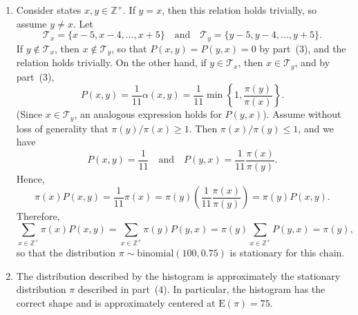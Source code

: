 \documentclass[12pt]{article}
\newcommand{\E}{\mathrm{E}}
\begin{document}
\begin{enumerate}
\item
Consider states $x, y \in \mathbb{Z}^+$. If $y = x$, then this relation holds trivially, so assume $y \neq x$. Let
\begin{equation*}
\mathcal{T}_x = \{x-5, x-4, \ldots, x+5\} \quad \text{and} \quad \mathcal{T}_y = \{y-5, y-4, \ldots, y+5\}.
\end{equation*}
If $y \not \in \mathcal{T}_x$, then $x \not \in \mathcal{T}_y$, so that $P(x, y) = P(y, x) = 0$ by part~(3), and the relation holds trivially. On the other hand, if $y \in \mathcal{T}_x$, then $x \in \mathcal{T}_y$, and by part~(3),
\begin{equation*}
P(x, y) = \frac{1}{11} \alpha(x, y) = \frac{1}{11} \min\left\{1, \frac{\pi(y)}{\pi(x)} \right\}.
\end{equation*}
(Since $x \in \mathcal{T}_y$, an analogous expression holds for $P(y, x)$). Assume without loss of generality that $\pi(y) / \pi(x) \geq 1$. Then $\pi(x) / \pi(y) \leq 1$, and we have
\begin{equation*}
P(x, y) = \frac{1}{11} \quad \text{and} \quad P(y, x) = \frac{1}{11} \frac{\pi(x)}{\pi(y)}.
\end{equation*}
Hence,
\begin{equation*}
\pi(x) P(x, y) = \frac{1}{11} \pi(x) = \pi(y) \left(\frac{1}{11} \frac{\pi(x)}{\pi(y)}\right) = \pi(y) P(x, y).
\end{equation*}
Therefore,
\begin{equation*}
\sum_{x \in \mathbb{Z}^+} \pi(x) P(x, y) = \sum_{x \in \mathbb{Z}^+} \pi(y) P(y, x) = \pi(y) \sum_{x \in \mathbb{Z}^+} P(y, x) = \pi(y),
\end{equation*}
so that the distribution $\pi \sim \mathrm{binomial(100, 0.75)}$ is stationary for this chain.

\item
The distribution described by the histogram is approximately the stationary distribution $\pi$ described in part~(4). In particular, the histogram has the correct shape and is approximately centered at $\E(\pi) = 75$.

\end{enumerate}
\end{document}
